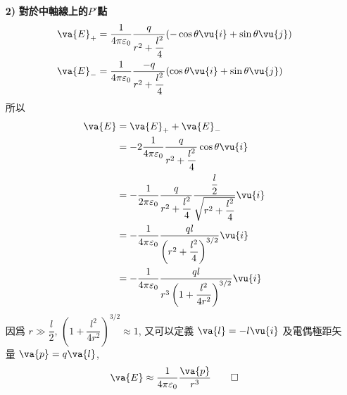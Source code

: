\begin{solve}
\begin{itemize}
        \item[\textbf{2)}]\textbf{對於中軸線上的$P'$點}
              \begin{align*}
                  \va{E}_+ & = \frac{1}{4\pi\varepsilon_0}\frac{q}{r^2 + \dfrac{l^2}{4}}(-\cos \theta \vu{i} + \sin \theta \vu{j}) \\
                  \va{E}_- & = \frac{1}{4\pi\varepsilon_0}\frac{-q}{r^2 + \dfrac{l^2}{4}}(\cos \theta \vu{i} + \sin \theta \vu{j})
              \end{align*}
              所以
              \begin{align*}
                  \va{E} & = \va{E}_{+} + \va{E}_{-}                                                                                           \\
                         & = -2\frac{1}{4\pi\varepsilon_0}\frac{q}{r^2 + \dfrac{l^2}{4}}\cos\theta \vu{i}                                      \\
                         & = -\frac{1}{2\pi\varepsilon_0}\frac{q}{r^2 + \dfrac{l^2}{4}}\frac{\dfrac{l}{2}}{\sqrt{r^2 + \dfrac{l^2}{4}}} \vu{i} \\
                         & = -\frac{1}{4\pi\varepsilon_0}\frac{ql}{\left(r^2 + \dfrac{l^2}{4}\right)^{3/2}} \vu{i}                             \\
                         & = -\frac{1}{4\pi\varepsilon_0}\frac{ql}{r^3\left(1 + \dfrac{l^2}{4r^2}\right)^{3/2}} \vu{i}
              \end{align*}
              因爲 $r \gg \dfrac{l}{2}$, $\left(1 + \dfrac{l^2}{4r^2}\right)^{3/2} \approx 1$, 又可以定義 $\va{l} = -l\vu{i}$ 及電偶極距矢量 $\va{p} = q\va{l}$,
              \begin{equation*}
                  \va{E} \approx \frac{1}{4\pi\varepsilon_0}\frac{\va{p}}{r^3} \qedhere
              \end{equation*}
    \end{itemize}
\end{solve}